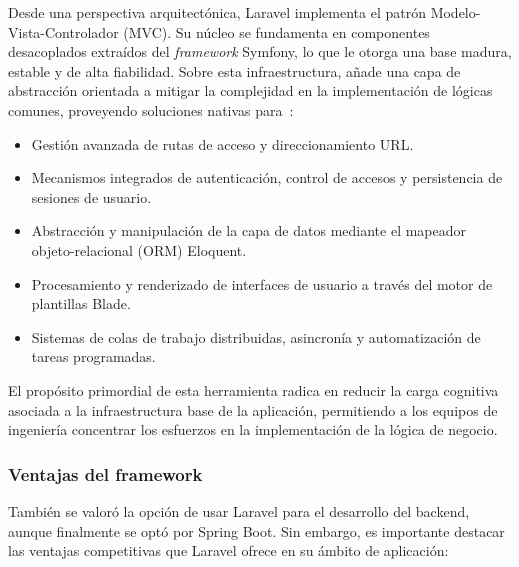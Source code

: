 Desde una perspectiva arquitectónica, Laravel implementa el patrón Modelo-Vista-Controlador (MVC). Su núcleo se fundamenta en componentes desacoplados extraídos del \textit{framework} Symfony, lo que le otorga una base madura, estable y de alta fiabilidad. Sobre esta infraestructura, añade una capa de abstracción orientada a mitigar la complejidad en la implementación de lógicas comunes, proveyendo soluciones nativas para~\cite{LaravelDocs}:

\begin{itemize}

\item Gestión avanzada de rutas de acceso y direccionamiento URL.

\item Mecanismos integrados de autenticación, control de accesos y persistencia de sesiones de usuario.

\item Abstracción y manipulación de la capa de datos mediante el mapeador objeto-relacional (ORM) Eloquent.

\item Procesamiento y renderizado de interfaces de usuario a través del motor de plantillas Blade.

\item Sistemas de colas de trabajo distribuidas, asincronía y automatización de tareas programadas.

\end{itemize}



El propósito primordial de esta herramienta radica en reducir la carga cognitiva asociada a la infraestructura base de la aplicación, permitiendo a los equipos de ingeniería concentrar los esfuerzos en la implementación de la lógica de negocio.



\subsubsection{Ventajas del framework}

También se valoró la opción de usar Laravel para el desarrollo del backend, aunque finalmente se optó por Spring Boot. Sin embargo, es importante destacar las ventajas competitivas que Laravel ofrece en su ámbito de aplicación:


